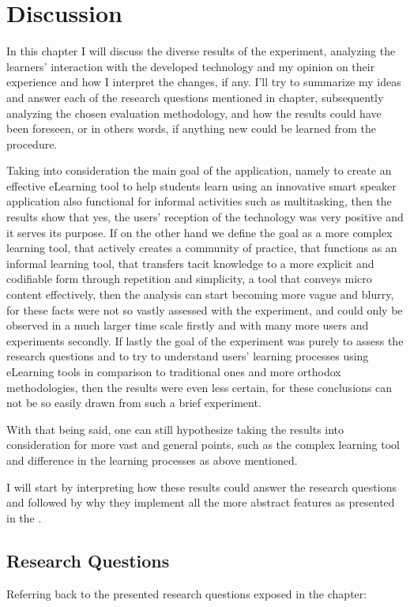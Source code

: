 \chapter{Discussion}
\label{cha:discussion}

In this chapter I will discuss the diverse results of the experiment, analyzing the learners' 
interaction with the developed technology and my opinion on their experience and how I interpret 
the changes, if any. I'll try to summarize my ideas and answer each of the research questions mentioned
in  chapter, subsequently analyzing the chosen evaluation methodology, and
how the results could have been foreseen, or in others words, if anything new could be learned from the procedure.


Taking into consideration the main goal of the application, namely to create an effective eLearning tool
to help students learn using an innovative smart speaker application also functional for informal 
activities such as multitasking, then the results show that yes, the users' reception of the technology was
very positive and it serves its purpose. If on the other hand we define the goal as a more complex learning 
tool, that actively creates a community of practice, that functions as an informal learning tool, that 
transfers tacit knowledge to a more explicit and codifiable form through repetition and simplicity, a tool
that conveys micro content effectively, then the analysis can start becoming more vague and blurry, for
these facts were not so vastly assessed with the experiment, and could only be observed in a much larger 
time scale firstly and with many more users and experiments secondly. 
If lastly the goal of the experiment was 
purely to assess the research questions and to try to understand users' learning processes using eLearning
tools in comparison to traditional ones and more orthodox methodologies, then the results were even less
certain, for these conclusions can not be so easily drawn from such a brief experiment.

With that being said, one can still hypothesize taking the results into consideration for more vast and 
general points, such as the complex learning tool and difference in the learning processes as above 
mentioned.

I will start by interpreting how these results could answer the research questions and followed by 
why they implement all the more abstract features as presented in the .

\section{Research Questions}
Referring back to the presented research questions exposed in the  chapter:

